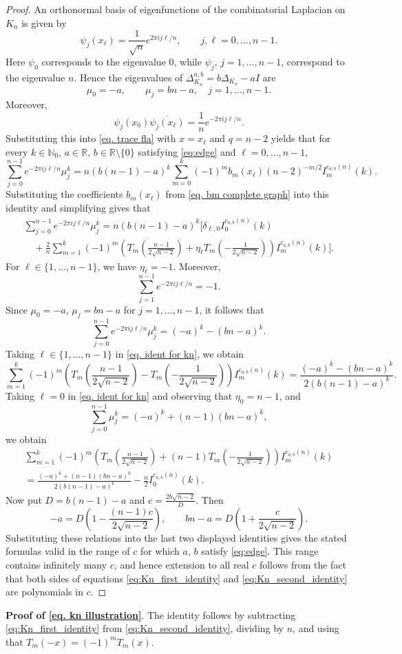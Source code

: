 \documentclass[reqno,10pt]{amsart}
\theoremstyle{definition}
\numberwithin{equation}{section}
\begin{document}
\begin{proof}
An orthonormal basis of eigenfunctions of the combinatorial Laplacian on
$K_n$ is given by
\[
\psi_j(x_\ell)=\frac1{\sqrt n}e^{2\pi i j\ell/n},
\qquad j,\ell=0,\ldots,n-1.
\]
Here $\psi_0$ corresponds to the eigenvalue $0$, while
$\psi_j$, $j=1,\ldots,n-1$, correspond to the eigenvalue $n$. Hence the
eigenvalues of $\Delta_{K_n}^{a,b}=b\Delta_{K_n}-aI$ are
\[
\mu_0=-a,\qquad
\mu_j=bn-a,\quad j=1,\ldots,n-1.
\]
Moreover,
\[
\psi_j(x_0)\overline{\psi_j(x_\ell)}
=
\frac1n e^{-2\pi i j\ell/n}.
\]
Substituting this into \eqref{eq. trace fla} with $x=x_\ell$ and $q=n-2$ yields that
for every $k\in\mathbb N_0$, $a\in\mathbb R$, $b\in\mathbb R\setminus \{0\}$ satisfying \eqref{eq:edge} and $\ell=0,\ldots,n-1$,
\[
\sum_{j=0}^{n-1}
e^{-2\pi i j\ell/n}\mu_j^k=n(b(n-1)-a)^k
\sum_{m=0}^{k}
(-1)^m
b_m(x_\ell)(n-2)^{-m/2}
I_m^{c_{a,b}(n)}(k).
\]
Substituting the coefficients $b_m(x_\ell)$ from \eqref{eq. bm complete graph}
into this identity and simplifying gives that
\begin{multline}\label{eq. ident for kn}
\sum_{j=0}^{n-1}
e^{-2\pi i j\ell/n}
\mu_j^k
=
n(b(n-1)-a)^k
\Bigg[
\delta_{\ell,0} I_0^{c_{a,b}(n)}(k) \\
\quad+
\frac{2}{n}
\sum_{m=1}^{k}
(-1)^m
\left(
T_m\!\left(\frac{n-1}{2\sqrt{n-2}}\right)
+
\eta_\ell
T_m\!\left(-\frac{1}{2\sqrt{n-2}}\right)
\right)
I_m^{c_{a,b}(n)}(k)
\Bigg].
\end{multline}
For $\ell\in\{1,\ldots,n-1\}$, we have $\eta_\ell=-1$. Moreover,
\[
\sum_{j=1}^{n-1}e^{-2\pi ij\ell/n}
=-1.
\]
Since $\mu_0=-a$, $\mu_j=bn-a$ for $j=1,\ldots,n-1$, it follows that
\[
\sum_{j=0}^{n-1}
e^{-2\pi ij\ell/n}\mu_j^k
=
(-a)^k-(bn-a)^k.
\]
Taking $\ell\in\{1,\ldots,n-1\}$ in \eqref{eq. ident for kn}, we obtain
\[
\sum_{m=1}^{k}
(-1)^m
\left(
T_m\!\left(\frac{n-1}{2\sqrt{n-2}}\right)
-
T_m\!\left(-\frac{1}{2\sqrt{n-2}}\right)
\right)
I_m^{c_{a,b}(n)}(k)
=
\frac{(-a)^k-(bn-a)^k}{2(b(n-1)-a)^k}.
\]
Taking $\ell=0$ in \eqref{eq. ident for kn} and observing that $\eta_0=n-1$, and
\[
\sum_{j=0}^{n-1}\mu_j^k
=
(-a)^k+(n-1)(bn-a)^k,
\]
we obtain
\begin{multline*}
\sum_{m=1}^{k}
(-1)^m
\left(
T_m\!\left(\frac{n-1}{2\sqrt{n-2}}\right)
+
(n-1)T_m\!\left(-\frac{1}{2\sqrt{n-2}}\right)
\right)
I_m^{c_{a,b}(n)}(k)\\
=
\frac{(-a)^k+(n-1)(bn-a)^k}{
2(b(n-1)-a)^k}
-\frac{n}{2}I_0^{c_{a,b}(n)}(k).
\end{multline*}
Now put $D=b(n-1)-a$ and $c=\frac{2b\sqrt{n-2}}{D}$. Then
\[
-a
=
D\left(1-\frac{(n-1)c}{2\sqrt{n-2}}\right),
\qquad
bn-a
=
D\left(1+\frac{c}{2\sqrt{n-2}}\right).
\]
Substituting these relations into the last two displayed identities gives the stated formulas valid in the range of $c$ for which $a,\, b$ satisfy \eqref{eq:edge}. This range contains infinitely many $c$, and hence extension to all real $c$ follows from the fact that both sides of equations \eqref{eq:Kn_first_identity} and \eqref{eq:Kn_second_identity}  are polynomials in $c$.
\end{proof}
\noindent
\textbf{Proof of \eqref{eq. kn illustration}}.
The identity  follows by subtracting
\eqref{eq:Kn_first_identity} from \eqref{eq:Kn_second_identity}, dividing by
$n$, and using that $T_m(-x)=(-1)^mT_m(x)$.
\end{document}
